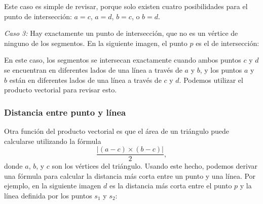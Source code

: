 Este caso es simple de revisar, porque solo existen cuatro posibilidades
para el punto de intersección: $a=c$, $a=d$, $b=c$, o $b=d$.

\textit{Caso 3:}
Hay exactamente un punto de intersección, que no es un vértice de ninguno de
los segmentos. En la siguiente imagen, el punto $p$ es el de intersección:
\begin{center}
\end{center}

En este caso, los segmentos se intersecan exactamente cuando ambos puntos
$c$ y $d$ se encuentran en diferentes lados de una línea a través de $a$ y
$b$, y los puntos $a$ y $b$ están en diferentes lados de una línea a través
de $c$ y $d$. Podemos utilizar el producto vectorial para revisar esto.

\subsubsection{Distancia entre punto y línea}

Otra función del producto vectorial es que el área de un triángulo puede
calcularse utilizando la fórmula \[\frac{| (a-c) \times (b-c) |}{2},\]
donde $a$, $b$, y $c$ son los vértices del triángulo. Usando este hecho,
podemos derivar una fórmula para calcular la distancia más corta entre
un punto y una línea. Por ejemplo, en la siguiente imagen $d$ es la
distancia más corta entre el punto $p$ y la línea definida por los puntos
$s_1$ y $s_2$:
\begin{center}
\end{center}

